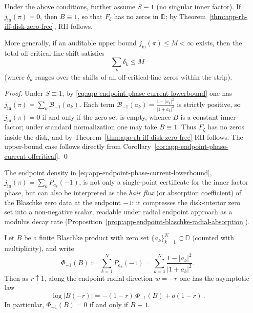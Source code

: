 \begin{corollary}\label{cor:app-endpoint-phase-certificate}
Under the above conditions, further assume \(S\equiv 1\) (no singular inner factor).
If \(j_{\mathrm{in}}(\pi)=0\), then \(B\equiv 1\), so that \(F_{\zeta}\) has no zeros in \(\mathbb{D}\); by Theorem~\ref{thm:app-rh-iff-disk-zero-free}, RH follows.
\par
More generally, if an auditable upper bound \(j_{\mathrm{in}}(\pi)\le M<\infty\) exists, then the total off-critical-line shift satisfies
\[
\boxed{\;\sum_k \delta_k\le M\;}
\]
(where \(\delta_k\) ranges over the shifts of all off-critical-line zeros within the strip).
\end{corollary}

\begin{proof}
Under \(S\equiv 1\), by \eqref{eq:app-endpoint-phase-current-lowerbound} one has \(j_{\mathrm{in}}(\pi)=\sum_k \mathcal{B}_{-1}(a_k)\).
Each term \(\mathcal{B}_{-1}(a_k)=\frac{1-|a_k|^2}{|1+a_k|^2}\) is strictly positive, so \(j_{\mathrm{in}}(\pi)=0\) if and only if the zero set is empty, whence \(B\) is a constant inner factor; under standard normalization one may take \(B\equiv 1\).
Thus \(F_{\zeta}\) has no zeros inside the disk, and by Theorem~\ref{thm:app-rh-iff-disk-zero-free} RH follows.
The upper-bound case follows directly from Corollary~\ref{cor:app-endpoint-phase-current-offcritical}. \qed
\end{proof}

\begin{remark}\label{rem:app-endpoint-hair-flux-absorption}
The endpoint density in \eqref{eq:app-endpoint-phase-current-lowerbound},
\(
j_{\mathrm{in}}(\pi)=\sum_k P_{a_k}(-1)
\),
is not only a single-point certificate for the inner factor phase, but can also be interpreted as the \emph{hair flux} (or absorption coefficient) of the Blaschke zero data at the endpoint \(-1\):
it compresses the disk-interior zero set into a non-negative scalar, readable under radial endpoint approach as a modulus decay rate (Proposition~\ref{prop:app-endpoint-blaschke-radial-absorption}).
\end{remark}

\begin{proposition}\label{prop:app-endpoint-blaschke-radial-absorption}
Let \(B\) be a finite Blaschke product with zero set \(\{a_k\}_{k=1}^{N}\subset\mathbb{D}\) (counted with multiplicity), and write
\[
\Phi_{-1}(B):=\sum_{k=1}^{N}P_{a_k}(-1)=\sum_{k=1}^{N}\frac{1-|a_k|^2}{|1+a_k|^2}.
\]
Then as \(r\uparrow 1\), along the endpoint radial direction \(w=-r\) one has the asymptotic law
\begin{equation}\label{eq:app-endpoint-blaschke-radial-absorption}
\boxed{\;
\log|B(-r)|=-(1-r)\,\Phi_{-1}(B)+o(1-r)\; }.
\end{equation}
In particular, \(\Phi_{-1}(B)=0\) if and only if \(B\equiv 1\).
\end{proposition}

